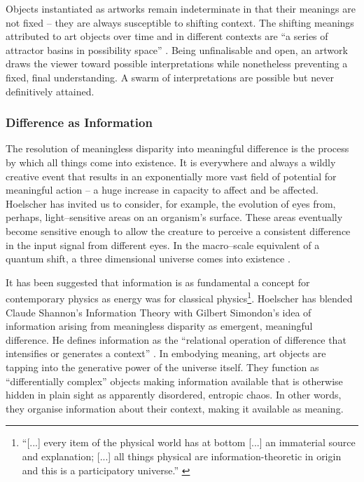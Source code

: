 \documentclass[letter:wpaper]{article}
\begin{document}
    Objects instantiated as artworks remain indeterminate in that their meanings are not fixed – they are always susceptible to shifting context. The shifting meanings attributed to art objects over time and in different contexts are “a series of attractor basins in possibility space” \citep[p.4]{HoelscherThPtcsOfPhsSpc2014}. Being unfinalisable and open, an artwork draws the viewer toward possible interpretations while nonetheless preventing a fixed, final understanding. A swarm of interpretations are possible but never definitively attained. \citep[p.12]{HoelscherThPtcsOfPhsSpc2014}

    \subsubsection{Difference as Information}

    The resolution of meaningless disparity into meaningful difference is the process by which all things come into existence. It is everywhere and always a wildly creative event that results in an exponentially more vast field of potential for meaningful action – a huge increase in capacity to affect and be affected. Hoelscher has invited us to consider, for example, the evolution of eyes from, perhaps, light–sensitive areas on an organism's surface. These areas eventually become sensitive enough to allow the creature to perceive a consistent difference in the input signal from different eyes. In the macro–scale equivalent of a quantum shift, a three dimensional universe comes into existence \citep[p.5]{HoelscherArtAsInfrmtn2021}.

    It has been suggested that information is as fundamental a concept for contemporary physics as energy was for classical physics\footnote{
        “[...] every item of the physical world has at bottom [...] an immaterial source and explanation; [...] all things physical are information-theoretic in origin and this is a participatory universe.” \citep{WheelerInfrmtnPhscsQntm2018}
    }. Hoelscher has blended Claude Shannon's Information Theory with Gilbert Simondon's idea of information arising from meaningless disparity as emergent, meaningful difference. He defines information as the “relational operation of difference that intensifies or generates a context” \citep[p.6]{HoelscherArtAsInfrmtn2021}. In embodying meaning, art objects are tapping into the generative power of the universe itself. They function as “differentially complex” \citep[p.74]{HoelscherArtAsInfrmtn2021} objects making information available that is otherwise hidden in plain sight as apparently disordered, entropic chaos. In other words, they organise information about their context, making it available as meaning.
\end{document}
